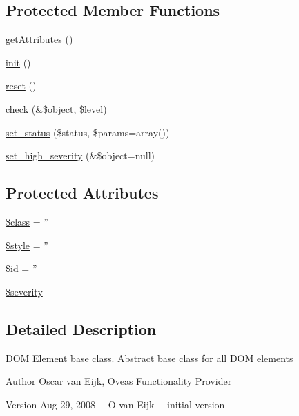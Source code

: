 \subsection*{Protected Member Functions}
\begin{DoxyCompactItemize}
\item 
\hyperlink{classbaseDOMelement_a9456b7731b213110c600bd39705d9135}{getAttributes} ()
\item 
\hyperlink{class__OWL_ae0ef3ded56e8a6b34b6461e5a721cd3e}{init} ()
\item 
\hyperlink{class__OWL_a2f2a042bcf31965194c03033df0edc9b}{reset} ()
\item 
\hyperlink{class__OWL_ad6f4f6946f40199dd0333cf219fa500e}{check} (\&\$object, \$level)
\item 
\hyperlink{class__OWL_aea912d0ede9b3c2a69b79072d94d4787}{set\_\-status} (\$status, \$params=array())
\item 
\hyperlink{class__OWL_a576829692a3b66e3d518853bf43abae3}{set\_\-high\_\-severity} (\&\$object=null)
\end{DoxyCompactItemize}
\subsection*{Protected Attributes}
\begin{DoxyCompactItemize}
\item 
\hyperlink{classbaseDOMelement_a929b59866de374b581d64fa93289af53}{\$class} = ''
\item 
\hyperlink{classbaseDOMelement_ac2251fd920ba526872d1611d9bfbcfe0}{\$style} = ''
\item 
\hyperlink{classbaseDOMelement_adee6a7dc22e62d1348140cd8b0c38c5a}{\$id} = ''
\item 
\hyperlink{class__OWL_ad26b40a9dbbacb33e299b17826f8327c}{\$severity}
\end{DoxyCompactItemize}


\subsection{Detailed Description}
DOM Element base class. Abstract base class for all DOM elements \begin{DoxyAuthor}{Author}
Oscar van Eijk, Oveas Functionality Provider 
\end{DoxyAuthor}
\begin{DoxyVersion}{Version}
Aug 29, 2008 -\/-\/ O van Eijk -\/-\/ initial version 
\end{DoxyVersion}


